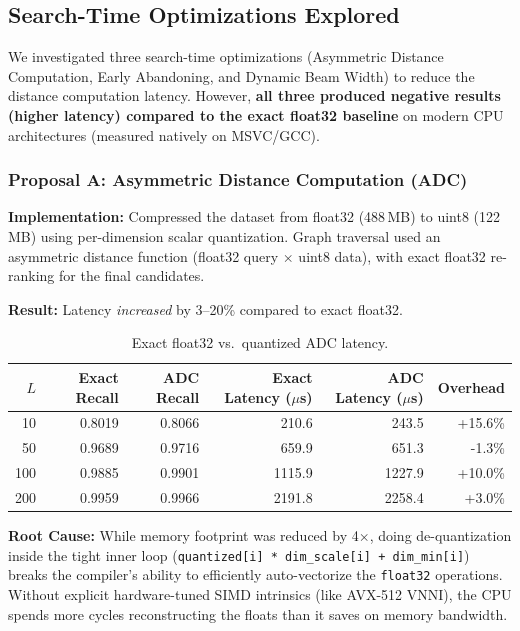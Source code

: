 \documentclass[10pt]{article}
\begin{document}
\subsection{Search-Time Optimizations Explored}

We investigated three search-time optimizations (Asymmetric Distance Computation, Early Abandoning, and Dynamic Beam Width) to reduce the distance computation latency. However, \textbf{all three produced negative results (higher latency) compared to the exact float32 baseline} on modern CPU architectures (measured natively on MSVC/GCC). 

\subsubsection{Proposal A: Asymmetric Distance Computation (ADC)}

\textbf{Implementation:} Compressed the dataset from float32 (488\,MB) to uint8 (122\,MB) using per-dimension scalar quantization. Graph traversal used an asymmetric distance function (float32 query $\times$ uint8 data), with exact float32 re-ranking for the final candidates.

\textbf{Result:} Latency \emph{increased} by 3--20\% compared to exact float32.

\begin{table}[H]
\centering
\begin{tabular}{rrrrrr}
\toprule
$L$ & Exact Recall & ADC Recall & Exact Latency ($\mu$s) & ADC Latency ($\mu$s) & Overhead \\
\midrule
10  & 0.8019 & 0.8066 & 210.6 & 243.5 & +15.6\% \\
50  & 0.9689 & 0.9716 & 659.9 & 651.3 & -1.3\% \\
100 & 0.9885 & 0.9901 & 1115.9 & 1227.9 & +10.0\% \\
200 & 0.9959 & 0.9966 & 2191.8 & 2258.4 & +3.0\% \\
\bottomrule
\end{tabular}
\caption{Exact float32 vs.\ quantized ADC latency.}
\label{tab:proposal_a}
\end{table}

\textbf{Root Cause:} While memory footprint was reduced by 4$\times$, doing de-quantization inside the tight inner loop (\texttt{quantized[i] * dim\_scale[i] + dim\_min[i]}) breaks the compiler's ability to efficiently auto-vectorize the \texttt{float32} operations. Without explicit hardware-tuned SIMD intrinsics (like AVX-512 VNNI), the CPU spends more cycles reconstructing the floats than it saves on memory bandwidth.
\end{document}
